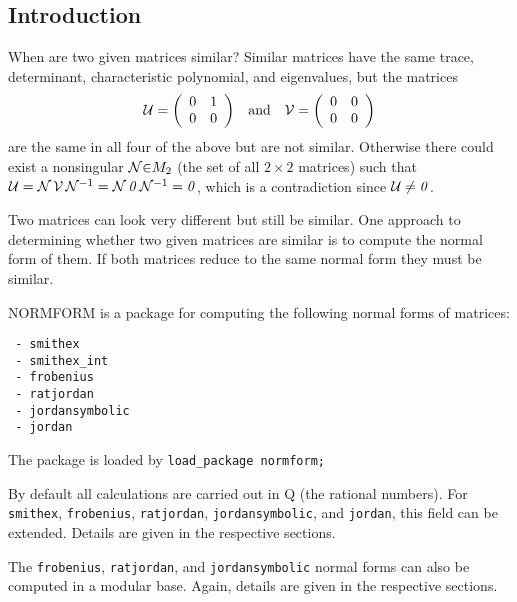 

\subsection{Introduction}
When are two given matrices similar? Similar matrices have the same
trace, determinant, \hspace{0in} characteristic polynomial, 
\hspace{0in} and eigenvalues, \hspace{0in} but the matrices 
\begin{displaymath}
\begin{array}{ccc} {\cal U} = \left( \begin{array}{cc} 0 & 1 \\ 0 & 
0 \end{array} \right) & $and$ & {\cal V} = \left( \begin{array}{cc} 
0 & 0 \\ 0 & 0 \end{array} \right) \end{array} 
\end{displaymath}
are the same in all four of the above but are not similar. Otherwise 
there could exist a nonsingular ${\cal N} {\in} M_{2}$ (the set of 
all $2 \times 2$ matrices) such that ${\cal U} = {\cal N} \, {\cal V}
\, {\cal N}^{-1} = {\cal N} \, {\it 0} \, {\cal N}^{-1} = {\it 0}$, 
which is a contradiction since ${\cal U} \neq {\it 0}$.

Two matrices can look very different but still be similar. One 
approach to determining whether two given matrices are similar is to 
compute the normal form of them. If both matrices reduce to the same 
normal form they must be similar.

{\small NORMFORM} is a package for computing the following normal 
forms of matrices:

\begin{verbatim}
 - smithex
 - smithex_int
 - frobenius
 - ratjordan
 - jordansymbolic
 - jordan
\end{verbatim}
 
The package is loaded by {\tt load\_package normform;}

By default all calculations are carried out in {\cal Q} (the rational 
numbers). For {\tt smithex}, {\tt frobenius}, {\tt ratjordan}, 
{\tt jordansymbolic}, and {\tt jordan}, this field can be extended. 
Details are given in the respective sections.

The {\tt frobenius}, {\tt ratjordan}, and {\tt jordansymbolic} normal 
forms can also be computed in a modular base. Again, details are given 
in the respective sections.

